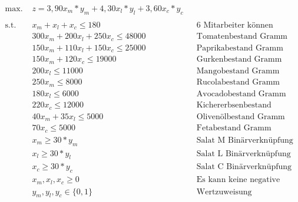 \documentclass[a4paper,11pt]{article}
\begin{document}
\begin{align*}
    \text{max. } & z = 3,90x_{m} * y_{m} + 4,30x_{l} * y_{l} + 3,60x_{c} * y_{c} \\
    \\
    \text{s.t. } & x_{m} + x_{l} + x_{c} \le 180 && \text{6 Mitarbeiter können täglich 30 Salate anrichten} \\
    & 300x_{m} + 200x_{l} + 250x_{c} \le 48000 && \text{Tomatenbestand Gramm} \\
    & 150x_{m} + 110x_{l} + 150x_{c} \le 25000 && \text{Paprikabestand Gramm} \\
    & 150x_{m} + 120x_{c} \le 19000 && \text{Gurkenbestand Gramm} \\
    & 200x_{l} \le 11000 && \text{Mangobestand Gramm} \\
    & 250x_{m} \le 8000 && \text{Rucolabestand Gramm} \\
    & 180x_{l} \le 6000 && \text{Avocadobestand Gramm} \\
    & 220x_{c} \le 12000 && \text{Kichererbsenbestand Gramm} \\
    & 40x_{m} + 35x_{l} \le 5000 && \text{Olivenölbestand Gramm} \\
    & 70x_{c} \le 5000 && \text{Fetabestand Gramm} \\
    & x_{m} \ge 30*y_{m} && \text{Salat M Binärverknüpfung} \\
    & x_{l} \ge 30*y_{l} && \text{Salat L Binärverknüpfung} \\
    & x_{c} \ge 30*y_{c} && \text{Salat C Binärverknüpfung} \\
    & x_{m}, x_{l}, x_{c} \ge 0 && \text{Es kann keine negative Menge angerichtet werden} \\
    & y_{m}, y_{l}, y_{c} \in \{ 0,1 \} && \text{Wertzuweisung Binärvariablen} \\
\end{align*}
\end{document}
